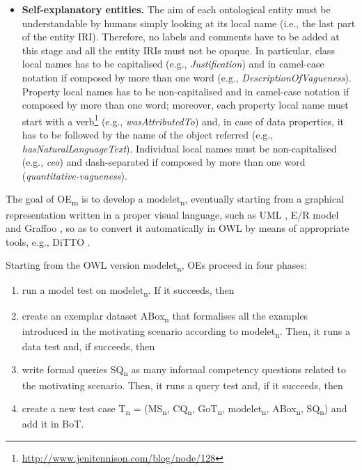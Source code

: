 \documentclass[runningheads,a4paper]{llncs}
\begin{document}
\begin{itemize}
\item {\bf Self-explanatory entities.} The aim of each ontological entity must be understandable by humans simply looking at its local name (i.e., the last part of the entity IRI). Therefore, no labels and comments have to be added at this stage and all the entity IRIs must not be opaque. In particular, class local names has to be capitalised (e.g., {\em Justification}) and in camel-case notation if composed by more than one word (e.g., {\em DescriptionOfVagueness}). Property local names has to be non-capitalised and in camel-case notation if composed by more than one word; moreover, each property local name must start with a verb\footnote{\url{http://www.jenitennison.com/blog/node/128}} (e.g., {\em wasAttributedTo}) and, in case of data properties, it has to be followed by the name of the object referred (e.g., {\em hasNaturalLanguageText}). Individual local names must be non-capitalised (e.g., {\em ceo}) and dash-separated if composed by more than one word ({\em quantitative-vagueness}).
\end{itemize}

The goal of OE\textsubscript{m} is to develop a modelet\textsubscript{n}, eventually starting from a graphical representation written in a proper visual language, such as UML  \cite{__RefNumPara__2974_1461357291}, E/R model  \cite{__RefNumPara__3022_1461357291} and Graffoo  \cite{__RefNumPara__3115_1461357291}, so as to convert it automatically in OWL by means of appropriate tools, e.g., DiTTO  \cite{__RefNumPara__8514_1461357291}.

Starting from the OWL version modelet\textsubscript{n}, OEs proceed in four phases:
\begin{enumerate}
\item run a model test on modelet\textsubscript{n}. If it succeeds, then
\item create an exemplar dataset ABox\textsubscript{n} that formalises all the examples introduced in the motivating scenario according to modelet\textsubscript{n}. Then, it runs a data test and, if succeeds, then
\item write formal queries SQ\textsubscript{n} as many informal competency questions related to the motivating scenario. Then, it runs a query test and, if it succeeds, then
\item create a new test case T\textsubscript{n }= (MS\textsubscript{n}, CQ\textsubscript{n}, GoT\textsubscript{n}, modelet\textsubscript{n}, ABox\textsubscript{n}, SQ\textsubscript{n}) and add it in BoT.
\end{enumerate}
\end{document}
